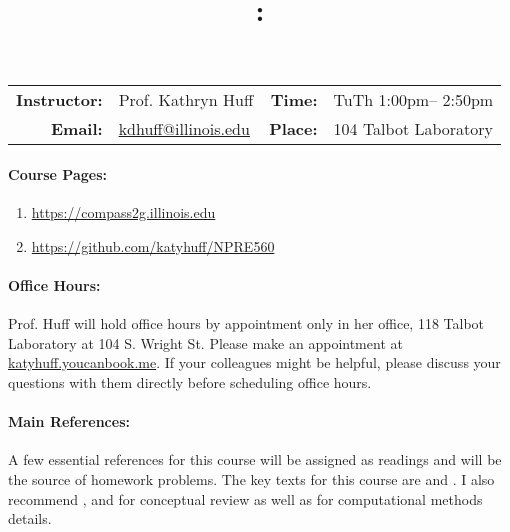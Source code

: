 \documentclass[11pt]{article}
\title{\CourseNumber: \CourseTitle\\}
\author{\CourseUniversity}
\date{\CourseSemester \CourseYear}
\makeatletter
\newcommand{\CourseNumber}{NPRE560}
\newcommand{\CourseDays}{TuTh\xspace}%
\newcommand{\CourseStart}{1:00pm\xspace}%
\newcommand{\CourseEnd}{2:50pm\xspace}%
\newcommand{\CourseInstructor}{Prof. Kathryn Huff}
\newcommand{\CourseInstructorEmail}{kdhuff@illinois.edu}
\newcommand{\CourseRoom}{104\xspace}%
\newcommand{\CourseBuilding}{Talbot Laboratory\xspace}%
\newcommand{\TeachingAssistant}{TA Name\xspace}%
\newcommand{\TAOfficeHourDays}{Wednesdays\xspace}%
\newcommand{\TAOfficeHourStart}{1:00pm\xspace}%
\newcommand{\TAOfficeHourEnd}{3:00pm\xspace}%
\newcommand{\TAOfficeHourPlace}{123 Talbot Laboratory\xspace}
\makeatother
\begin{document}
\maketitle
\renewcommand{\arraystretch}{2}
\begin{center}
\begin{table}[h]
\begin{tabularx}{\textwidth}{rXrX}
\hline
\textbf{Instructor:} & \CourseInstructor & \textbf{Time:} & \CourseDays \CourseStart -- \CourseEnd \\
\textbf{Email:} &  \href{mailto:\CourseInstructorEmail}{\CourseInstructorEmail} & \textbf{Place:} & \CourseRoom \CourseBuilding\\
\hline
\end{tabularx}

\end{table}
\end{center}

\paragraph{Course Pages:}
\begin{enumerate}
        \item \url{https://compass2g.illinois.edu}
        \item \url{https://github.com/katyhuff/\CourseNumber}
\end{enumerate}


\paragraph{Office Hours:} Prof. Huff will hold office hours by appointment only
in her office, 118 Talbot Laboratory at 104 S. Wright St.  Please make an appointment at 
\url{katyhuff.youcanbook.me}. If your colleagues might be helpful, please 
discuss your questions with them directly before scheduling office hours.

\paragraph{Main References:}
A few essential references for this course will be assigned as readings and 
will be the source of homework problems. The key texts for this course are
\cite{ott_introductory_1985} and
\cite{hetrick_dynamics_1993}.
I also recommend 
\cite{stacey_nuclear_2007}, \cite{bell_nuclear_1970} and
\cite{duderstadt_transport_1979} for conceptual review as well as
\cite{lewis_computational_1993} for computational methods details.

\renewcommand{\refname}{\normalfont\selectfont\normalsize}

\end{document}
